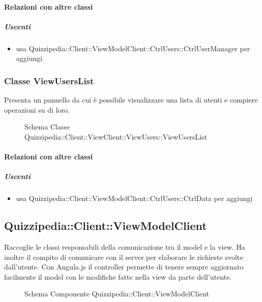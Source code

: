 \paragraph{Relazioni con altre classi}
\subparagraph{Uscenti}
\begin{itemize}
\item usa Quizzipedia::Client::ViewModelClient::CtrlUsers::CtrlUserManager per aggiungi
\end{itemize}
\subsubsection{Classe ViewUsersList}
Presenta un pannello da cui è possibile visualizzare una lista di utenti e compiere operazioni su di loro.
\begin{figure}[H]
\centering
\noindent{}
\caption[Schema Classe ViewUsersList]{Schema Classe Quizzipedia::Client::ViewClient::ViewUsers::ViewUsersList}
\end{figure}
\paragraph{Relazioni con altre classi}
\subparagraph{Uscenti}
\begin{itemize}
\item usa Quizzipedia::Client::ViewModelClient::CtrlUsers::CtrlData per aggiungi
\end{itemize}
\subsection{Quizzipedia::Client::ViewModelClient}
Raccoglie le classi responsabili della comunicazione tra il model e la view. Ha inoltre il compito di comunicare con il server per elaborare le richieste svolte dall'utente.
Con Angula.js il controller permette di tenere sempre aggiornato facilmente il model con le modifiche fatte nella view da parte dell'utente.
\begin{figure}[H]
\centering
\noindent{}
\caption[Schema Componente Quizzipedia::Client::ViewModelClient]{Schema Componente Quizzipedia::Client::ViewModelClient}
\end{figure}
